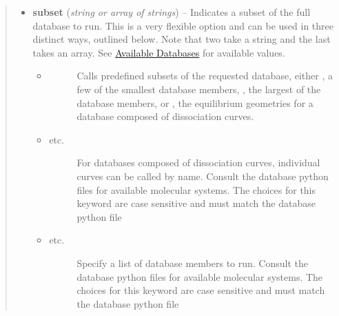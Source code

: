 \documentclass[letterpaper,10pt,english]{sphinxmanual}
\begin{document}
\begin{fulllineitems}
\begin{quote}
\begin{description}
\begin{itemize}
\item {} 
\textbf{subset} (\emph{string or array of strings}) -- 
Indicates a subset of the full database to run. This is a very
flexible option and can be used in three distinct ways, outlined
below. Note that two take a string and the last takes an array.
See {\hyperref[db:available-databases]{Available Databases}} for available values.
\begin{itemize}
\item {} \begin{description}
\item[{ \textbar{}\textbar{}  \textbar{}\textbar{} }] \leavevmode
Calls predefined subsets of the requested database, either
, a few of the smallest database members,
, the largest of the database members, or
, the equilibrium geometries for a database
composed of dissociation curves.

\end{description}

\item {} \begin{description}
\item[{ \textbar{}\textbar{}  \textbar{}\textbar{}  \textbar{}\textbar{} etc.}] \leavevmode
For databases composed of dissociation curves, individual
curves can be called by name. Consult the database python
files for available molecular systems.  The choices for this
keyword are case sensitive and must match the database python file

\end{description}

\item {} \begin{description}
\item[{\code{{[}1,2,5{]}} \textbar{}\textbar{} \code{{[}'1','2','5'{]}} \textbar{}\textbar{}  \textbar{}\textbar{} etc.}] \leavevmode
Specify a list of database members to run. Consult the
database python files for available molecular systems.  The
choices for this keyword are case sensitive and must match the
database python file

\end{description}

\end{itemize}


\end{itemize}


\end{description}
\end{quote}
\end{fulllineitems}
\end{document}
